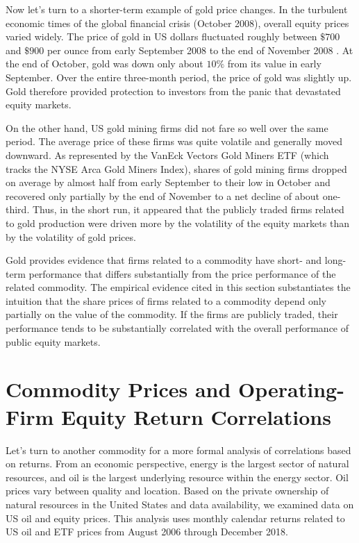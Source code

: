 \documentclass[11pt]{article}
\begin{document}
Now let's turn to a shorter-term example of gold price changes. In the turbulent economic times of the global financial crisis (October 2008), overall equity prices varied widely. The price of gold in US dollars fluctuated roughly between $\$ 700$ and $\$ 900$ per ounce from early September 2008 to the end of November 2008 . At the end of October, gold was down only about $10 \%$ from its value in early September. Over the entire three-month period, the price of gold was slightly up. Gold therefore provided protection to investors from the panic that devastated equity markets.

On the other hand, US gold mining firms did not fare so well over the same period. The average price of these firms was quite volatile and generally moved downward. As represented by the VanEck Vectors Gold Miners ETF (which tracks the NYSE Arca Gold Miners Index), shares of gold mining firms dropped on average by almost half from early September to their low in October and recovered only partially by the end of November to a net decline of about one-third. Thus, in the short run, it appeared that the publicly traded firms related to gold production were driven more by the volatility of the equity markets than by the volatility of gold prices.

Gold provides evidence that firms related to a commodity have short- and long-term performance that differs substantially from the price performance of the related commodity. The empirical evidence cited in this section substantiates the intuition that the share prices of firms related to a commodity depend only partially on the value of the commodity. If the firms are publicly traded, their performance tends to be substantially correlated with the overall performance of public equity markets.

\section*{Commodity Prices and Operating-Firm Equity Return Correlations}
Let's turn to another commodity for a more formal analysis of correlations based on returns. From an economic perspective, energy is the largest sector of natural resources, and oil is the largest underlying resource within the energy sector. Oil prices vary between quality and location. Based on the private ownership of natural resources in the United States and data availability, we examined data on US oil and equity prices. This analysis uses monthly calendar returns related to US oil and ETF prices from August 2006 through December 2018.
\end{document}
